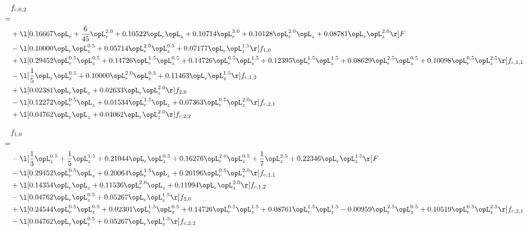 \begin{alignat}{2} 
\label{eq:f_02_2} 
& f_{c,0,2} \nonumber \\ 
 = \\ 
& + \l[  0.16667 \opL_r + \frac{6}{45} \opL_r^{2.0} +  0.10522 \opL_r \opL_z +  0.10714 \opL_r^{3.0} +  0.10128 \opL_r^{2.0} \opL_z +  0.08781 \opL_r \opL_z^{2.0}  \r] F \nonumber \\ 
& - \l[  0.10000 \opL_r \opL_z^{0.5} +  0.05714 \opL_r^{2.0} \opL_z^{0.5} +  0.07177 \opL_r \opL_z^{1.5}  \r] f_{1,0} \nonumber \\ 
& + \l[  0.29452 \opL_r^{0.5} \opL_z^{0.5} +  0.14726 \opL_r^{1.5} \opL_z^{0.5} +  0.14726 \opL_r^{0.5} \opL_z^{1.5} +  0.12395 \opL_r^{1.5} \opL_z^{1.5} +  0.08629 \opL_r^{2.5} \opL_z^{0.5} +  0.10098 \opL_r^{0.5} \opL_z^{2.5}  \r] f_{c,1,1} \nonumber \\ 
& - \l[ \frac{1}{5} \opL_r \opL_z^{0.5} +  0.10000 \opL_r^{2.0} \opL_z^{0.5} +  0.11463 \opL_r \opL_z^{1.5}  \r] f_{c,1,2} \nonumber \\ 
& + \l[  0.02381 \opL_r \opL_z +  0.02633 \opL_r \opL_z^{2.0}  \r] f_{2,0} \nonumber \\ 
& - \l[  0.12272 \opL_r^{0.5} \opL_z +  0.01534 \opL_r^{1.5} \opL_z +  0.07363 \opL_r^{0.5} \opL_z^{2.0}  \r] f_{c,2,1} \nonumber \\ 
& + \l[  0.04762 \opL_r \opL_z +  0.04062 \opL_r \opL_z^{2.0}  \r] f_{c,2,2} \nonumber \\ 
\end{alignat} 


\begin{alignat}{2} 
\label{eq:f_10_2} 
& f_{1,0} \nonumber \\ 
 = \\ 
& - \l[ \frac{1}{3} \opL_z^{0.5} + \frac{1}{5} \opL_z^{1.5} +  0.21044 \opL_r \opL_z^{0.5} +  0.16276 \opL_r^{2.0} \opL_z^{0.5} + \frac{1}{7} \opL_z^{2.5} +  0.22346 \opL_r \opL_z^{1.5}  \r] F \nonumber \\ 
& - \l[  0.29452 \opL_r^{0.5} \opL_z +  0.20064 \opL_r^{1.5} \opL_z +  0.20196 \opL_r^{0.5} \opL_z^{2.0}  \r] f_{c,1,1} \nonumber \\ 
& + \l[  0.14354 \opL_r \opL_z +  0.11536 \opL_r^{2.0} \opL_z +  0.11994 \opL_r \opL_z^{2.0}  \r] f_{c,1,2} \nonumber \\ 
& - \l[  0.04762 \opL_r \opL_z^{0.5} +  0.05267 \opL_r \opL_z^{1.5}  \r] f_{2,0} \nonumber \\ 
& + \l[  0.24544 \opL_r^{0.5} \opL_z^{0.5} +  0.02301 \opL_r^{1.5} \opL_z^{0.5} +  0.14726 \opL_r^{0.5} \opL_z^{1.5} +  0.08761 \opL_r^{1.5} \opL_z^{1.5}   -0.00959 \opL_r^{2.5} \opL_z^{0.5} +  0.10519 \opL_r^{0.5} \opL_z^{2.5}  \r] f_{c,2,1} \nonumber \\ 
& - \l[  0.04762 \opL_r \opL_z^{0.5} +  0.05267 \opL_r \opL_z^{1.5}  \r] f_{c,2,2} \nonumber \\ 
\end{alignat} 


